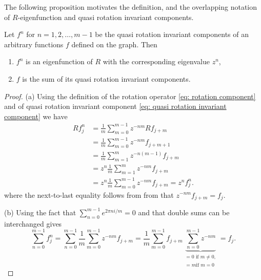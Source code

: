 The following proposition motivates the definition, and the overlapping notation of $R$-eigenfunction and quasi rotation invariant components.

\begin{proposition}\label{thm: quasi rotation invariant component}
  Let $f^n$ for $n = 1, 2, \ldots, m-1$ be the quasi rotation invariant components of an arbitrary functions $f$ defined on the graph. Then
  \begin{enumerate}
    \item $f^n$ is an eigenfunction of $R$ with the corresponding eigenvalue $z^n$, %
    \item $f$ is the sum of its quasi rotation invariant components.%
  \end{enumerate}
\end{proposition}

\begin{proof}
  (a)
  Using the definition of the rotation operator \eqref{eq: rotation component} and of quasi rotation invariant component \eqref{eq: quasi rotation invariant component} we have
  \begin{align*}
    R f^n_j &=
    \frac{1}{m} \sum_{m=0}^{m-1} z^{-nm} R f_{j+m} \\ &=
    \frac{1}{m} \sum_{m=0}^{m-1} z^{-nm} f_{j+m+1} \\ &=
    \frac{1}{m} \sum_{m=1}^{m} z^{-n(m-1)} f_{j+m} \\ &=
    z^n \frac{1}{m} \sum_{m=1}^{m} z^{-nm} f_{j+m} \\ &=
    z^n \frac{1}{m} \sum_{m=0}^{m-1} z^{-nm} f_{j+m} = z^n f^n_j.
  \end{align*}
  where the next-to-last equality follows from from that $z^{-nm}f_{j+m} = f_j$.%

  (b) Using the fact that $\sum_{n=0}^{m-1} e^{2\pi n i / m} = 0$ and that double sums can be interchanged gives
  \[
    \sum_{n=0}^{m-1} f^n_j
    = \sum_{n=0}^{m-1} \frac{1}{m} \sum_{m=0}^{m-1} z^{-nm} f_{j+m}
    = \frac{1}{m} \sum_{m=0}^{m-1} f_{j+m} \underbrace{\sum_{n=0}^{m-1} z^{-nm}}_{\substack{
      = 0 \text{ if } m \ne 0, \\
      = m \text{if } m = 0
    }} = f_j.
  \]
\end{proof}

